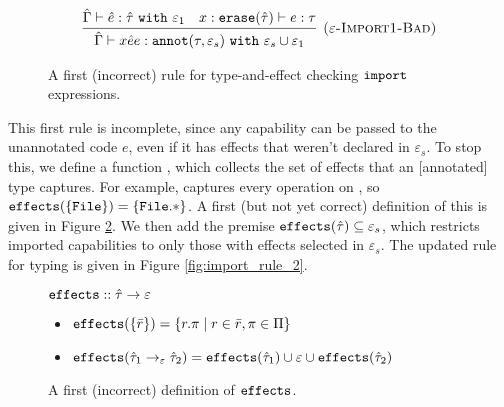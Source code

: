 \begin{figure}[h]
\vspace{-0.5cm}
\[
\begin{array}{c}

\infer[\textsc{($\varepsilon$-Import1-Bad)}]
	{ \hat \Gamma \vdash {x}{\hat e}{e}: \kwa{annot}(\tau, \varepsilon_s)~\kw{with} \varepsilon_s \cup \varepsilon_1 }
	{ \hat \Gamma \vdash \hat e: \hat \tau~\kw{with} \varepsilon_1 & x: \kwa{erase}(\hat \tau) \vdash e: \tau }

\end{array}
\]
\vspace{-0.5cm}
\caption{A first (incorrect) rule for type-and-effect checking $\mathtt{import}$ expressions.}
\vspace{-0.5cm}
\label{fig:import_rule_1}
\end{figure}

This first rule is incomplete, since any capability can be passed to the unannotated
code $e$, even if it has effects that weren't declared in $\varepsilon_s$. To stop
this, we define a function , which collects the
set of effects that an [annotated] type captures. For example, 
captures every operation on , so $\mathtt{effects}(\{\mathtt{File}\}) = \mathtt{\{File.*\}}$.
A first (but not yet correct) definition of this is given in Figure \ref{fig:fx_defn}.
We then add the premise $\mathtt{effects}(\hat \tau) \subseteq \varepsilon_s$,
which restricts imported capabilities to only those with effects selected in
$\varepsilon_s$. The updated rule for typing  is given in Figure
\ref{fig:import_rule_2}.

\begin{figure}

$\mathtt{effects} :: \hat \tau \rightarrow \varepsilon$
\vspace{-0.2cm}
\begin{itemize}
	\setlength\itemsep{-0.2em}
	\item[] $\mathtt{effects}(\{ \bar r \}) = \{ r.\pi \mid r \in \bar r, \pi \in \Pi \}$
	\item[] $\mathtt{effects}(\hat \tau_1 \rightarrow_{\varepsilon} \hat \tau_2) = \mathtt{effects}(\hat \tau_1) \cup \varepsilon \cup \mathtt{effects}(\hat \tau_2)$
\end{itemize}
\vspace{-0.5cm}
\caption{A first (incorrect) definition of $\mathtt{effects}$.}
\vspace{-0.5cm}
\label{fig:fx_defn}
\end{figure}

